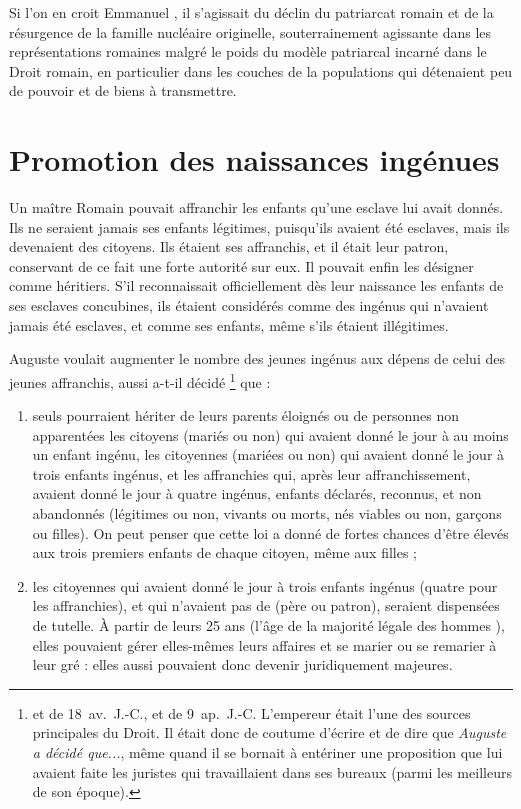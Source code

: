  Si l'on en croit Emmanuel , il s'agissait du déclin du patriarcat romain et de la résurgence de la famille nucléaire originelle, souterrainement agissante dans les représentations romaines malgré le poids du modèle patriarcal incarné dans le Droit romain, en particulier dans les couches de la populations qui détenaient peu de pouvoir et de biens à transmettre. 


\section{Promotion des naissances ingénues}

 Un maître Romain pouvait affranchir les enfants qu'une esclave lui avait donnés. Ils ne seraient jamais ses enfants légitimes, puisqu'ils avaient été esclaves, mais ils devenaient des citoyens. Ils étaient ses affranchis, et il était leur patron, conservant de ce fait une forte autorité sur eux. Il pouvait enfin les désigner comme héritiers. S'il reconnaissait officiellement dès leur naissance les enfants de ses esclaves concubines, ils étaient considérés comme des ingénus qui n'avaient jamais été esclaves, et comme ses enfants, même s'ils étaient illégitimes. 

 Auguste voulait augmenter le nombre des jeunes ingénus aux dépens de celui des jeunes affranchis, aussi a-t-il décidé%
\footnote{ et  de \mbox{18 av. J.-C.}, et  de \mbox{9 ap. J.-C.} L'empereur était l'une des sources principales du Droit. Il était donc de coutume d'écrire et de dire que {\emph{Auguste a décidé que...}}, même quand il se bornait à entériner une proposition que lui avaient faite les juristes qui travaillaient dans ses bureaux (parmi les meilleurs de son époque).}
que :
\begin{enumerate}
\item seuls pourraient hériter de leurs parents éloignés ou de personnes non apparentées les citoyens (mariés ou non) qui avaient donné le jour à au moins un enfant ingénu, les citoyennes (mariées ou non) qui avaient donné le jour à trois enfants ingénus, et les affranchies qui, après leur affranchissement, avaient donné le jour à quatre ingénus, enfants déclarés, reconnus, et non abandonnés (légitimes ou non, vivants ou morts, nés viables ou non, garçons ou filles). On peut penser que cette loi a donné de fortes chances d'être élevés aux trois premiers enfants de chaque citoyen, même aux filles ;
\item les citoyennes qui avaient donné le jour à trois enfants ingénus (quatre pour les affranchies), et qui n'avaient pas de  (père ou patron), seraient dispensées de tutelle. À partir de leurs 25 ans (l'âge de la majorité légale des hommes ), elles pouvaient gérer elles-mêmes leurs affaires et se marier ou se remarier à leur gré : elles aussi pouvaient donc devenir juridiquement majeures. 
\end{enumerate}


